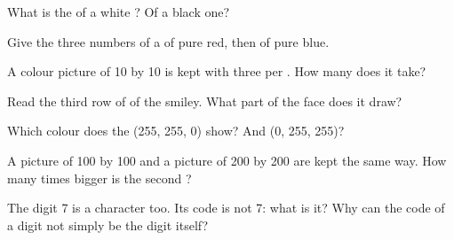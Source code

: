 \begin{exercise}[$\star$]\label{exo:g5:text-pictures-sound-as-numbers:5}
What is the  of a white ? Of a black one?
\end{exercise}

\begin{exercise}[$\star$]\label{exo:g5:text-pictures-sound-as-numbers:6}
Give the three numbers of a  of pure red, then of pure blue.
\end{exercise}

\begin{exercise}[$\star$]\label{exo:g5:text-pictures-sound-as-numbers:7}
A colour picture of 10 by 10  is kept with three  per . How
many  does it take?
\end{exercise}

\begin{exercise}[$\star$]\label{exo:g5:text-pictures-sound-as-numbers:8}
Read the third row of  of the smiley. What part of the face does it draw?
\end{exercise}

\begin{exercise}[$\star\star$]\label{exo:g5:text-pictures-sound-as-numbers:9}
Which colour does the  (255, 255, 0) show? And (0, 255, 255)?
\end{exercise}

\begin{exercise}[$\star\star$]\label{exo:g5:text-pictures-sound-as-numbers:10}
A picture of 100 by 100  and a picture of 200 by 200  are kept the
same way. How many times bigger is the second ?
\end{exercise}

\begin{exercise}[$\star\star$]\label{exo:g5:text-pictures-sound-as-numbers:11}
The digit 7 is a character too. Its code is not 7: what is it? Why can the code
of a digit not simply be the digit itself?
\end{exercise}
